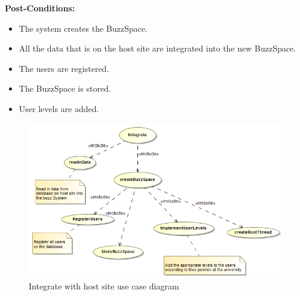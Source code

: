 \documentclass[11pt]{article}
\begin{document}
\begin{enumerate}
\begin{itemize}
\begin{itemize}
	\end{itemize}

\textbf{Post-Conditions: }
	\begin{itemize}
		\item The system creates the BuzzSpace.
		\item All the data that is on the host site are integrated into the new BuzzSpace.
		\item The users are registered.
		\item The BuzzSpace is stored.
		\item User levels are added.
	\end{itemize}
\end{itemize}

\graphicspath{ {../Diagrams/Maret/usecase/} }	
	\begin{figure}[H]	
    	\includegraphics[scale=0.5]{Integrate.png}
    	\caption{Integrate with host site use case diagram}
	\end{figure}
	

\end{enumerate}
\end{document}
